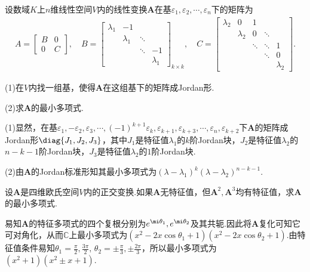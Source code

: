 \begin{prob}[8]
	设数域$K$上$n$维线性空间$V$内的线性变换$\bm A$在基$\varepsilon_1,\varepsilon_2,\cdots,\varepsilon_n$下的矩阵为
	\begin{gather*}
		A=\begin{bmatrix}
			B & 0 \\
			0 & C
		\end{bmatrix},\quad B=\begin{bmatrix}
			\lambda_1 & -1        &        &           \\
			          & \lambda_1 & \ddots &           \\
			          &           & \ddots & -1        \\
			          &           &        & \lambda_1
		\end{bmatrix}_{k\times k},\quad C=\begin{bmatrix}
			\lambda_2 & 0         & 1      &        &           \\
			          & \lambda_2 & 0      & \ddots &           \\
			          &           & \ddots & \ddots & 1         \\
			          &           &        & \ddots & 0         \\
			          &           &        &        & \lambda_2
		\end{bmatrix}.
	\end{gather*}

	(1)在$V$内找一组基，使得$\bm A$在这组基下的矩阵成Jordan形.

	(2)求$\bm A$的最小多项式.
\end{prob}
\begin{sol}
	(1)显然，在基$\varepsilon_1,-\varepsilon_2,\varepsilon_3,\cdots,(-1)^{k+1}\varepsilon_k,\varepsilon_{k+1},\varepsilon_{k+3},\cdots,\varepsilon_n,\varepsilon_{k+2}$下$\bm A$的矩阵成Jordan形$\diag{J_1,J_2,J_3}$，其中$J_1$是特征值$\lambda_1$的$k$阶Jordan块，$J_2$是特征值$\lambda_2$的$n-k-1$阶Jordan块，$J_3$是特征值$\lambda_2$的$1$阶Jordan块.

	(2)由$\bm A$的Jordan标准形知其最小多项式为$(\lambda-\lambda_1)^k(\lambda-\lambda_2)^{n-k-1}$.
\end{sol}
\begin{prob}[9]
	设$\bm A$是四维欧氏空间$V$内的正交变换.如果$\bm A$无特征值，但$\bm A^2,\bm A^3$均有特征值，求$\bm A$的最小多项式.
\end{prob}
\begin{sol}
	易知$\bm A$的特征多项式的四个复根分别为$e^{\mi\theta_1},e^{\mi\theta_2}$及其共轭.因此将$\bm A$复化可知它可对角化，从而$\mathbb{C}$上最小多项式为$(x^2-2x\cos\theta_1+1)(x^2-2x\cos\theta_2+1)$.由特征值条件易知$\theta_1=\frac{\pi}{2},\frac{3\pi}{2},\,\theta_2=\pm\frac{\pi}{3},\pm\frac{2\pi}{3}$，所以最小多项式为$(x^2+1)(x^2\pm x+1)$.
\end{sol}
